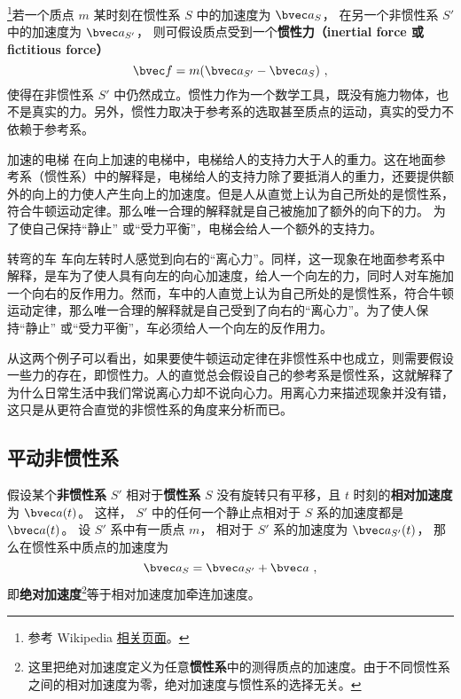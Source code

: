 

\footnote{参考 Wikipedia \href{https://en.wikipedia.org/wiki/Fictitious_force}{相关页面}。}若一个质点 $m$ 某时刻在惯性系 $S$ 中的加速度为 $\bvec a_{S}$， 在另一个非惯性系 $S'$ 中的加速度为 $\bvec a_{S'}$， 则可假设质点受到一个\textbf{惯性力（inertial force 或 fictitious force）}
\begin{equation}\label{eq_Iner_1}
\bvec f = m( \bvec a_{S'} - \bvec a_{S} )~,
\end{equation}
使得在非惯性系 $S'$ 中仍然成立。惯性力作为一个数学工具，既没有施力物体，也不是真实的力。另外，惯性力取决于参考系的选取甚至质点的运动，真实的受力不依赖于参考系。

\begin{example}{加速的电梯}\label{ex_Iner_1}
在向上加速的电梯中，电梯给人的支持力大于人的重力。这在地面参考系（惯性系）中的解释是，电梯给人的支持力除了要抵消人的重力，还要提供额外的向上的力使人产生向上的加速度。但是人从直觉上认为自己所处的是惯性系，符合牛顿运动定律。那么唯一合理的解释就是自己被施加了额外的向下的力。 为了使自己保持“静止” 或“受力平衡”，电梯会给人一个额外的支持力。
\end{example}

\begin{example}{转弯的车}
车向左转时人感觉到向右的“离心力”。同样，这一现象在地面参考系中解释，是车为了使人具有向左的向心加速度，给人一个向左的力，同时人对车施加一个向右的反作用力。然而，车中的人直觉上认为自己所处的是惯性系，符合牛顿运动定律，那么唯一合理的解释就是自己受到了向右的“离心力”。为了使人保持“静止” 或“受力平衡”，车必须给人一个向左的反作用力。
\end{example}

从这两个例子可以看出，如果要使牛顿运动定律在非惯性系中也成立，则需要假设一些力的存在，即惯性力。人的直觉总会假设自己的参考系是惯性系，这就解释了为什么日常生活中我们常说离心力却不说向心力。用离心力来描述现象并没有错，这只是从更符合直觉的非惯性系的角度来分析而已。

\subsection{平动非惯性系}
假设某个\textbf{非惯性系} $S'$ 相对于\textbf{惯性系} $S$ 没有旋转只有平移，且 $t$ 时刻的\textbf{相对加速度}为 $\bvec a(t)$。 这样， $S'$ 中的任何一个静止点相对于 $S$ 系的加速度都是 $\bvec a(t)$。 设 $S'$ 系中有一质点 $m$， 相对于 $S'$ 系的加速度为 $\bvec a_{S'} (t)$， 那么在惯性系中质点的加速度为
\begin{equation}\label{eq_Iner_2}
\bvec a_{S} = \bvec a_{S'} + \bvec a~,
\end{equation}
即\textbf{绝对加速度}\footnote{这里把绝对加速度定义为任意\textbf{惯性系}中的测得质点的加速度。由于不同惯性系之间的相对加速度为零，绝对加速度与惯性系的选择无关。}等于相对加速度加牵连加速度。


